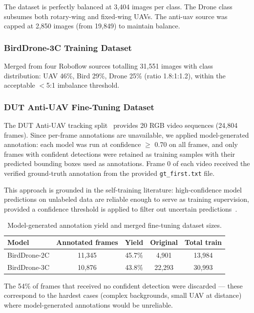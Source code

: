 \documentclass[11pt]{article}
\begin{document}
The dataset is perfectly balanced at 3,404 images per class. The Drone class
subsumes both rotary-wing and fixed-wing UAVs. The anti-uav source was capped
at 2,850 images (from 19,849) to maintain balance.

\subsubsection{BirdDrone-3C Training Dataset}

Merged from four Roboflow sources totalling 31,551 images with class
distribution: UAV 46\%, Bird 29\%, Drone 25\% (ratio 1.8:1:1.2), within
the acceptable $<$5:1 imbalance threshold.

\subsubsection{DUT Anti-UAV Fine-Tuning Dataset}

The DUT Anti-UAV tracking split~\cite{dutantiuav2022} provides 20 RGB video
sequences (24,804 frames). Since per-frame annotations are unavailable, we
applied model-generated annotation: each model was run at confidence $\geq$ 0.70
on all frames, and only frames with confident detections were retained as
training samples with their predicted bounding boxes used as annotations.
Frame 0 of each video received the verified ground-truth annotation from
the provided \texttt{gt\_first.txt} file.

This approach is grounded in the self-training literature: high-confidence
model predictions on unlabeled data are reliable enough to serve as training
supervision, provided a confidence threshold is applied to filter out
uncertain predictions~\cite{ultralytics2025}.

\begin{table}[H]
\centering
\caption{Model-generated annotation yield and merged fine-tuning dataset sizes.}
\label{tab:finetune_data}
\begin{tabular}{lcccc}
\toprule
\textbf{Model} & \textbf{Annotated frames} & \textbf{Yield} & \textbf{Original} & \textbf{Total train} \\
\midrule
BirdDrone-2C & 11,345 & 45.7\% & 4,901 & 13,984 \\
BirdDrone-3C & 10,876 & 43.8\% & 22,293 & 30,993 \\
\bottomrule
\end{tabular}
\end{table}

The 54\% of frames that received no confident detection were discarded ---
these correspond to the hardest cases (complex backgrounds, small UAV at
distance) where model-generated annotations would be unreliable.
\end{document}

